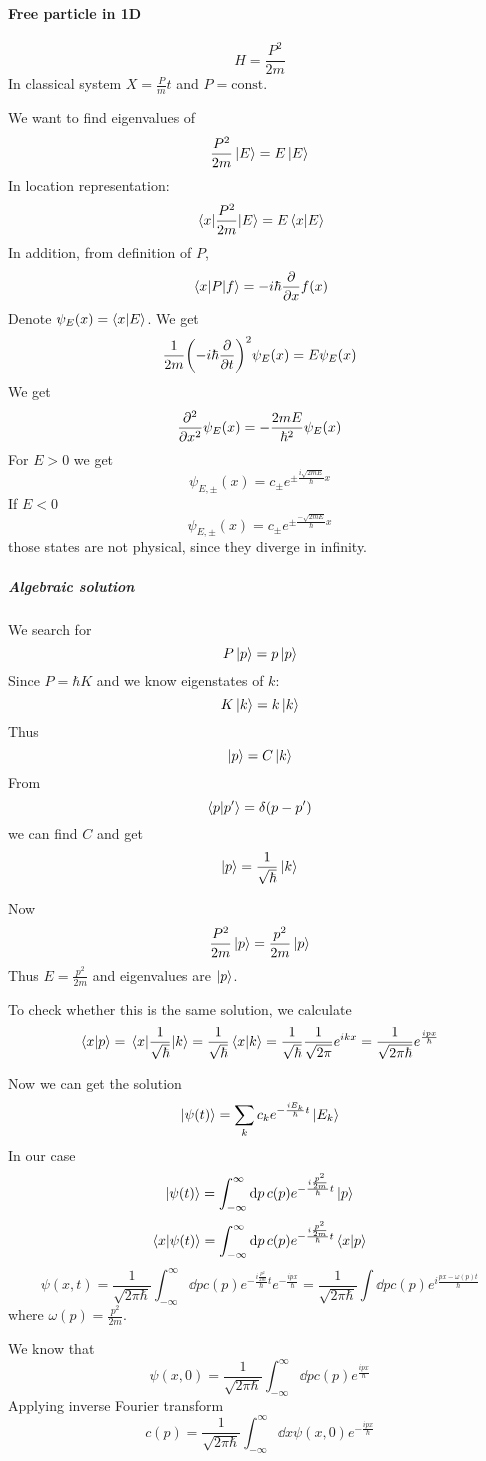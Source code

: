 \paragraph{Free particle in 1D}
$$H = \frac{P^2}{2m}$$
In classical system $X = \frac{P}{m}t$ and $P=\text{const}$.

We want to find eigenvalues of 
$$\frac{P^2}{2m} \ket{E} = E\ket{E}$$
In location representation:
$$\mel{x}{\frac{P^2}{2m}}{E} = E\braket{x}{E}$$
In addition, from definition of $P$,
$$\mel{x}{P}{f} = -i\hbar \pdv{x} f(x)$$
Denote $\psi_E(x) = \braket{x}{E}$. We get
$$\frac{1}{2m} \qty(-i\hbar \pdv{t})^2 \psi_E(x)  = E\psi_E(x)$$
We get
$$\pdv[2]{x} \psi_E(x)  = -\frac{2mE}{\hbar^2} \psi_E(x)$$
For $E>0$ we get
$$\psi_{E,\pm}(x) = c_{\pm} e^{\pm \frac{i\sqrt{2mE}}{\hbar}x}$$
If $E<0$
$$\psi_{E,\pm}(x) = c_{\pm} e^{\pm \frac{-\sqrt{2mE}}{\hbar}x}$$
those states are not physical, since they diverge in infinity.
\subparagraph{Algebraic solution}
We search for
$$P\ket{p} = p\ket{p}$$
Since $P=\hbar K$ and we know eigenstates of $k$:
$$K\ket{k} = k\ket{k}$$
Thus
$$\ket{p} = C\ket{k}$$
From
$$\braket{p}{p'} = \delta(p-p')$$
we can find $C$ and get
$$\ket{p} = \frac{1}{\sqrt{\hbar}} \ket{k}$$

Now
$$\frac{P^2}{2m}\ket{p} = \frac{p^2}{2m}\ket{p}$$
Thus $E=\frac{p^2}{2m}$ and eigenvalues are $\ket{p}$.

To check whether this is the same solution, we calculate
$$\braket{x}{p} = \mel{x}{\frac{1}{\sqrt{\hbar}}}{k} = \frac{1}{\sqrt{\hbar}}\braket{x}{k} = \frac{1}{\sqrt{\hbar}} \frac{1}{\sqrt{2\pi}} e^{ikx} = \frac{1}{\sqrt{2\pi \hbar}}  e^{\frac{ipx}{\hbar}}$$

Now we can get the solution
$$\ket{\psi(t)} = \sum_k c_k e^{-\frac{iE_k}{\hbar}t} \ket{E_k} $$
In our case
$$\ket{\psi(t)} = \int_{-\infty}^\infty \dd{p} c(p) e^{-\frac{i\frac{p^2}{2m}}{\hbar}t} \ket{p} $$
$$\braket{x}{\psi(t)} =  \int_{-\infty}^\infty \dd{p} c(p) e^{-\frac{i\frac{p^2}{2m}}{\hbar}t} \braket{x}{p}$$
$$\psi(x,t) =  \frac{1}{\sqrt{2\pi \hbar}}\int_{-\infty}^\infty \dd{p} c(p) e^{-\frac{i\frac{p^2}{2m}}{\hbar}t} e^{-\frac{ipx}{\hbar}} = \frac{1}{\sqrt{2\pi \hbar}} \int \dd{p} c(p) e^{i\frac{px - \omega(p) t}{\hbar}}$$
where $\omega(p) = \frac{p^2}{2m}$. 
	
We know that
	$$\psi(x,0) = \frac{1}{\sqrt{2\pi \hbar}} \int_{-\infty}^\infty \dd{p} c(p) e^{\frac{ipx}{\hbar}} $$
Applying inverse Fourier transform
	$$c(p) = \frac{1}{\sqrt{2\pi \hbar}} \int_{-\infty}^\infty \dd{x} \psi(x,0) e^{-\frac{ipx}{\hbar}} $$